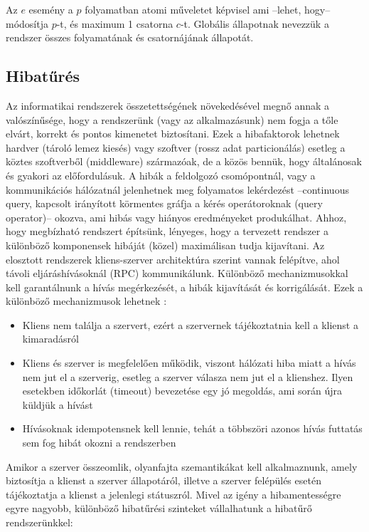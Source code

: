 \documentclass[a4paper,12pt]{article}
\begin{document}
Az $e$ esemény a $p$ folyamatban atomi műveletet képvisel ami --lehet, hogy-- módosítja $p$-t, és maximum 1 csatorna $c$-t. Globális állapotnak nevezzük a rendszer összes folyamatának és csatornájának állapotát. \newline


\subsection{Hibatűrés}

Az informatikai rendszerek összetettségének növekedésével megnő annak a valószínűsége, hogy a rendszerünk (vagy az alkalmazásunk) nem fogja a tőle elvárt, korrekt és pontos kimenetet biztosítani. Ezek a hibafaktorok lehetnek hardver (tároló lemez kiesés) vagy szoftver (rossz adat particionálás) esetleg a köztes szoftverből (middleware) származóak, de a közös bennük, hogy általánosak és gyakori az előfordulásuk.  A hibák a feldolgozó csomópontnál, vagy a kommunikációs hálózatnál jelenhetnek meg folyamatos lekérdezést --continuous query, kapcsolt irányított körmentes gráfja a kérés operátoroknak (query operator)-- okozva, ami hibás vagy hiányos eredményeket produkálhat\cite{balazinska}. Ahhoz, hogy megbízható rendszert építsünk, lényeges, hogy a tervezett rendszer a különböző komponensek hibáját (közel) maximálisan tudja kijavítani. Az elosztott rendszerek kliens-szerver architektúra szerint vannak felépítve, ahol távoli eljáráshívásoknál (RPC) kommunikálunk. Különböző mechanizmusokkal kell garantálnunk a hívás megérkezését, a hibák kijavítását és korrigálását. Ezek a különböző mechanizmusok lehetnek \cite{szemantika}:

\begin{itemize}
\item Kliens nem találja a szervert, ezért a szervernek tájékoztatnia kell a klienst a kimaradásról
\item Kliens és szerver is megfelelően működik, viszont hálózati hiba miatt a hívás nem jut el a szerverig, esetleg a szerver válasza nem jut el a klienshez. Ilyen esetekben időkorlát (timeout) bevezetése egy jó megoldás, ami során újra küldjük a hívást
\item Hívásoknak idempotensnek kell lennie, tehát a többszöri azonos hívás futtatás sem fog hibát okozni a rendszerben
\end{itemize}

Amikor a szerver összeomlik, olyanfajta szemantikákat kell alkalmaznunk, amely biztosítja a klienst a szerver állapotáról, illetve a szerver felépülés esetén tájékoztatja a klienst a jelenlegi státuszról. \newline
Mivel az igény a hibamentességre egyre nagyobb, különböző hibatűrési szinteket vállalhatunk a hibatűrő rendszerünkkel: \cite{akka}
\end{document}
